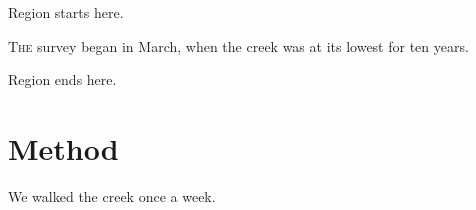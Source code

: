 \documentclass[11pt]{article}
\begin{document}
Region starts here.

\lettrine{T}{he} survey began in March, when the creek was at its lowest for ten years.

Region ends here.

\section{Method}
We walked the creek once a week.
\end{document}
